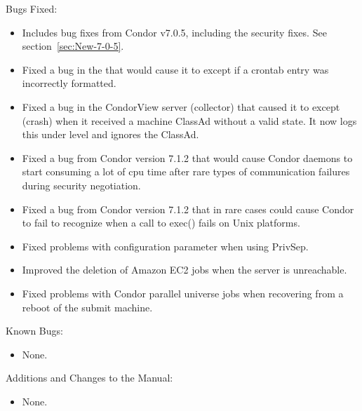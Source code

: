 \noindent Bugs Fixed:

\begin{itemize}

\item Includes bug fixes from Condor v7.0.5, including the security fixes.
	See section~\ref{sec:New-7-0-5}.

\item Fixed a bug in the  that would cause it to
except if a crontab entry was incorrectly formatted.

\item Fixed a bug in the CondorView server (collector) that caused it
to except (crash) when it received a machine ClassAd without a valid state.
It now logs this under level  and ignores the ClassAd.

\item Fixed a bug from Condor version 7.1.2 that would cause 
Condor daemons to start
consuming a lot of cpu time after rare types of communication failures
during security negotiation.

\item Fixed a bug from Condor version 7.1.2 that in rare cases could cause
	Condor to fail to recognize when a call to exec() fails on Unix
	platforms.

\item Fixed problems with configuration parameter
	 when using PrivSep.

\item Improved the deletion of Amazon EC2 jobs when the server is
	unreachable.

\item Fixed problems with Condor parallel universe jobs when recovering from
	a reboot of the submit machine.

\end{itemize}

\noindent Known Bugs:

\begin{itemize}

\item None.

\end{itemize}

\noindent Additions and Changes to the Manual:

\begin{itemize}

\item None.

\end{itemize}

